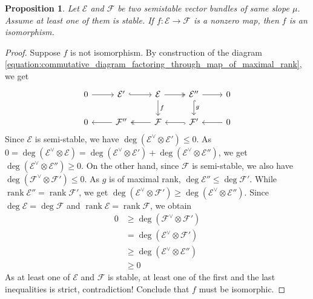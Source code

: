 \documentclass{ctexart}
\newtheorem{proposition}{Proposition}[section]
\newcommand{\rank}{\operatorname{rank}}
\begin{document}
\begin{proposition}
    Let $\mathcal{E}$ and $\mathcal{F}$ be two semistable vector bundles of same slope $\mu$.
    Assume at least one of them is stable.
    If $f: \mathcal{E} \rightarrow \mathcal{F}$ is a nonzero map, then $f$ is an isomorphism.
    \label{Proposition 6.4}
\end{proposition}
\begin{proof}
    Suppose $f$ is not isomorphism.
    By construction of the diagram \ref{equation:commutative_diagram_factoring_through_map_of_maximal_rank}, we get
    \begin{equation}
        \begin{tikzcd}
            0 \arrow[r] &
            \mathcal{E}' \arrow[r, hookrightarrow] &
            \mathcal{E} \arrow[r, twoheadrightarrow] \arrow[d, "f"] &
            \mathcal{E}'' \arrow[r] \arrow[d, hookrightarrow, "g"] &
            0 \\
            0 &
            \mathcal{F}'' \arrow[l] &
            \mathcal{F} \arrow[l, twoheadrightarrow] &
            \mathcal{F}' \arrow[l, hookrightarrow] &
            0 \arrow[l] 
        \end{tikzcd}
    \end{equation}
    Since $\mathcal{E}$ is semi-stable, we have $\deg (\mathcal{E}^{\vee} \otimes \mathcal{E}') \le 0$.
    As $0 = \deg (\mathcal{E}^{\vee} \otimes \mathcal{E}) = \deg (\mathcal{E}^{\vee} \otimes \mathcal{E}') + \deg (\mathcal{E}^{\vee} \otimes \mathcal{E}'')$, we get $\deg (\mathcal{E}^{\vee} \otimes \mathcal{E}'') \ge 0$.
    On the other hand, since $\mathcal{F}$ is semi-stable, we also have $\deg (\mathcal{F}^{\vee} \otimes \mathcal{F}') \le 0$.
    As $g$ is of maximal rank, $\deg \mathcal{E}'' \le \deg \mathcal{F}'$.
    While $\rank \mathcal{E}'' = \rank \mathcal{F}'$, we get $\deg (\mathcal{E}^{\vee} \otimes \mathcal{F}') \ge \deg (\mathcal{E}^{\vee} \otimes \mathcal{E}'')$.
    Since $\deg \mathcal{E} = \deg \mathcal{F}$ and $\rank \mathcal{E} = \rank \mathcal{F}$, we obtain
    \begin{equation}
        \begin{split}
            0 & \ge \deg (\mathcal{F}^{\vee} \otimes \mathcal{F}') \\
            & = \deg (\mathcal{E}^{\vee} \otimes \mathcal{F}') \\
            & \ge \deg (\mathcal{E}^{\vee} \otimes \mathcal{E}'') \\
            & \ge 0
        \end{split}
    \end{equation}
    As at least one of $\mathcal{E}$ and $\mathcal{F}$ is stable, at least one of the first and the last inequalities is strict, contradiction!
    Conclude that $f$ must be isomorphic.
\end{proof}
\end{document}
